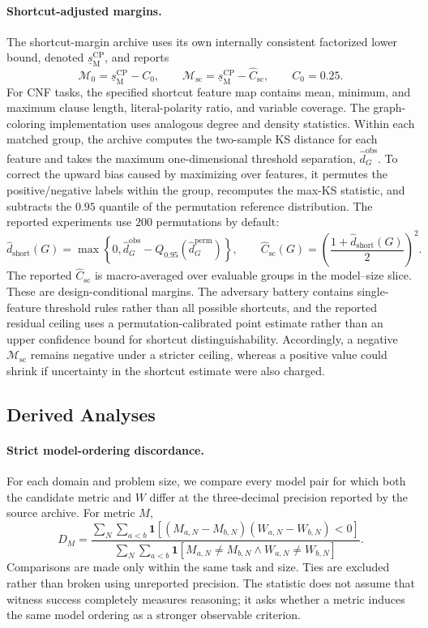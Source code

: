 \documentclass[acmsmall,screen,review,anonymous]{acmart}
\providecommand{\WitnessRate}{W}
\providecommand{\SepCPM}{\underline{s}^{\mathrm{CP}}_{\mathrm{M}}}
\providecommand{\MarginZero}{\mathcal{M}_{0}}
\providecommand{\MarginShortcut}{\mathcal{M}_{\mathrm{sc}}}
\providecommand{\Czero}{C_{0}}
\providecommand{\Cshortcut}{\widehat{C}_{\mathrm{sc}}}
\newcounter{experiment}
\begin{document}
\paragraph{Shortcut-adjusted margins.}
The shortcut-margin archive uses its own internally consistent factorized
lower bound, denoted \(\SepCPM\), and reports
\[
\MarginZero=\SepCPM-\Czero,
\qquad
\MarginShortcut=\SepCPM-\Cshortcut,
\qquad
\Czero=0.25.
\]
For CNF tasks, the specified shortcut feature map contains mean, minimum, and
maximum clause length, literal-polarity ratio, and variable coverage. The
graph-coloring implementation uses analogous degree and density statistics.
Within each matched group, the archive computes the two-sample KS distance for
each feature and takes the maximum one-dimensional threshold separation,
\(\hat d_G^{\mathrm{obs}}\). To correct the upward bias caused by maximizing
over features, it permutes the positive/negative labels within the group,
recomputes the max-KS statistic, and subtracts the \(0.95\) quantile of the
permutation reference distribution. The reported experiments use \(200\)
permutations by default:
\[
\hat d_{\mathrm{short}}(G)
=
\max\left\{
0,
\hat d_G^{\mathrm{obs}}
-
Q_{0.95}\!\left(\hat d_G^{\mathrm{perm}}\right)
\right\},
\qquad
\Cshortcut(G)
=
\left(
\frac{1+\hat d_{\mathrm{short}}(G)}{2}
\right)^2.
\]
The reported \(\Cshortcut\) is macro-averaged over evaluable groups in the
model--size slice. These are design-conditional margins. The adversary battery
contains single-feature threshold rules rather than all possible shortcuts,
and the reported residual ceiling uses a permutation-calibrated point estimate
rather than an upper confidence bound for shortcut distinguishability.
Accordingly, a negative \(\MarginShortcut\) remains negative under a stricter ceiling,
whereas a positive value could shrink if uncertainty in the shortcut estimate
were also charged.

\subsection{Derived Analyses}
\label{sec:derived-analyses}

\paragraph{Strict model-ordering discordance.}
For each domain and problem size, we compare every model pair for which both
the candidate metric and \(\WitnessRate\) differ at the three-decimal
precision reported by the source archive. For metric \(M\),
\[
D_M
=
\frac{
\sum_N\sum_{a<b}
\mathbf{1}
\left[
(M_{a,N}-M_{b,N})
(\WitnessRate_{a,N}-\WitnessRate_{b,N})<0
\right]
}{
\sum_N\sum_{a<b}
\mathbf{1}
\left[
M_{a,N}\neq M_{b,N}
\land
\WitnessRate_{a,N}\neq\WitnessRate_{b,N}
\right]
}.
\]
Comparisons are made only within the same task and size. Ties are excluded
rather than broken using unreported precision. The statistic does not assume
that witness success completely measures reasoning; it asks whether a metric
induces the same model ordering as a stronger observable criterion.
\end{document}
